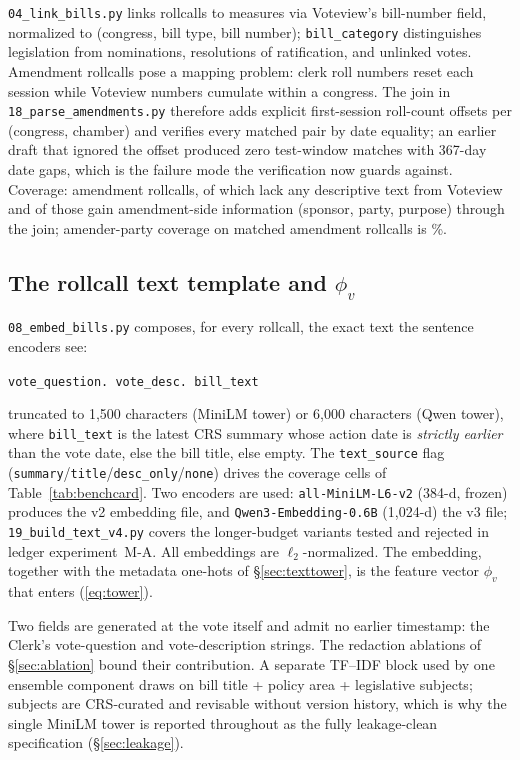 \documentclass[11pt]{article}
\newcommand{\code}[1]{\texttt{#1}}
\begin{document}
\code{04\_link\_bills.py} links rollcalls to measures via Voteview's
bill-number field, normalized to (congress, bill type, bill number);
\code{bill\_category} distinguishes legislation from nominations,
resolutions of ratification, and unlinked votes. Amendment rollcalls
pose a mapping problem: clerk roll numbers reset each session while
Voteview numbers cumulate within a congress. The join in
\code{18\_parse\_amendments.py} therefore adds explicit first-session
roll-count offsets per (congress, chamber) and verifies every matched
pair by date equality; an earlier draft that ignored the offset
produced zero test-window matches with 367-day date gaps, which is the
failure mode the verification now guards against. Coverage:
\amdtTotal{} amendment rollcalls, of which \amdtNoDesc{} lack any
descriptive text from Voteview and \amdtFilledNoDesc{} of those gain
amendment-side information (sponsor, party, purpose) through the join;
amender-party coverage on matched amendment rollcalls is
\amdtSponsorCov\%.

\subsection{The rollcall text template and $\phi_v$}
\label{sec:template}

\code{08\_embed\_bills.py} composes, for every rollcall, the exact text
the sentence encoders see:
\begin{center}
\code{vote\_question. vote\_desc. bill\_text}
\end{center}
truncated to 1{,}500 characters (MiniLM tower) or 6{,}000 characters
(Qwen tower), where \code{bill\_text} is the latest CRS summary whose
action date is \emph{strictly earlier} than the vote date, else the
bill title, else empty. The \code{text\_source} flag
(\code{summary}/\code{title}/\code{desc\_only}/\code{none}) drives the
coverage cells of Table~\ref{tab:benchcard}. Two encoders are used:
\code{all-MiniLM-L6-v2} (384-d, frozen) produces the v2 embedding file,
and \code{Qwen3-Embedding-0.6B} (1{,}024-d) the v3 file;
\code{19\_build\_text\_v4.py} covers the longer-budget variants tested
and rejected in ledger experiment~M-A. All embeddings are
$\ell_2$-normalized. The embedding, together with the metadata one-hots
of \S\ref{sec:texttower}, is the feature vector $\phi_v$ that enters
(\ref{eq:tower}).

Two fields are generated at the vote itself and admit no earlier
timestamp: the Clerk's vote-question and vote-description strings. The
redaction ablations of \S\ref{sec:ablation} bound their contribution. A
separate TF--IDF block used by one ensemble component draws on bill
title + policy area + legislative subjects; subjects are CRS-curated and
revisable without version history, which is why the single MiniLM tower
is reported throughout as the fully leakage-clean specification
(\S\ref{sec:leakage}).
\end{document}
